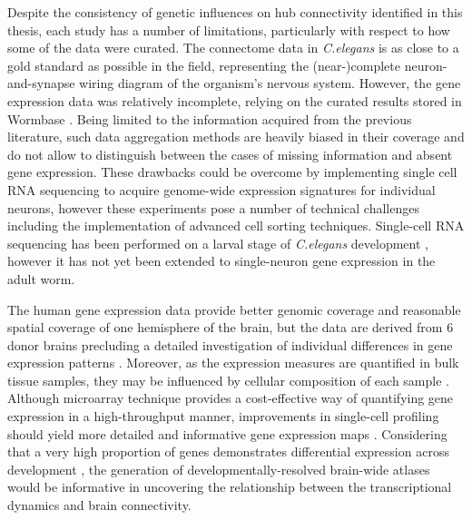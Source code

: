 Despite the consistency of genetic influences on hub connectivity identified in this thesis, each study has a number of limitations, particularly with respect to how some of the data were curated. The connectome data in \textit{C.elegans} is as close to a gold standard as possible in the field, representing the (near-)complete neuron-and-synapse wiring diagram of the organism's nervous system. However, the gene expression data was relatively incomplete, relying on the curated results stored in Wormbase \citep{Harris2010}. Being limited to the information acquired from the previous literature, such data aggregation methods are heavily biased in their coverage and do not allow to distinguish between the cases of missing information and absent gene expression. These drawbacks could be overcome by implementing single cell RNA sequencing to acquire genome-wide expression signatures for individual neurons, however these experiments pose a number of technical challenges including the implementation of advanced cell sorting techniques. Single-cell RNA sequencing has been performed on a larval stage of \textit{C.elegans} development \citep{Cao2017}, however it has not yet been extended to single-neuron gene expression in the adult worm.

The human gene expression data provide better genomic coverage and reasonable spatial coverage of one hemisphere of the brain, but the data are derived from 6 donor brains precluding a detailed investigation of individual differences in gene expression patterns \citep{Arnatkeviciute2019,Hawrylycz2015}. Moreover, as the expression measures are quantified in bulk tissue samples, they may be influenced by cellular composition of each sample \citep{Tasic2016}. Although microarray technique provides a cost-effective way of quantifying gene expression in a high-throughput manner, improvements in single-cell profiling should yield more detailed and informative gene expression maps \citep{Lein2017}. Considering that a very high proportion of genes demonstrates differential expression across development \citep{Colantuoni2011}, the generation of developmentally-resolved brain-wide atlases would be informative in uncovering the relationship between the transcriptional dynamics and brain connectivity.

